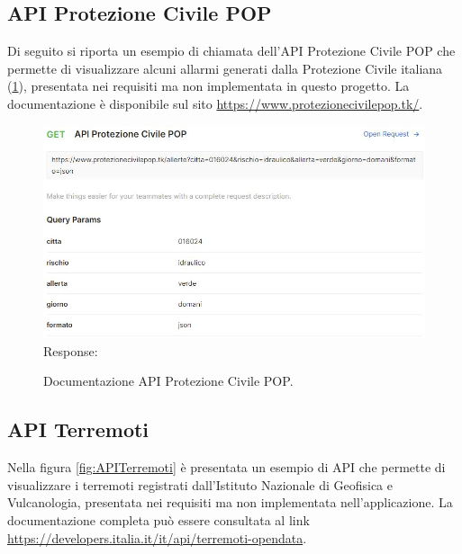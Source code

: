 \clearpage

\subsection{API Protezione Civile POP}
Di seguito si riporta un esempio di chiamata dell'API Protezione Civile POP che permette di visualizzare alcuni allarmi generati dalla Protezione Civile italiana (\Fig\ref{fig:APIPOP}), presentata nei requisiti ma non implementata in questo progetto. La documentazione è disponibile sul sito \url{https://www.protezionecivilepop.tk/}.

\begin{figure}[h!]
	\centering
	\includegraphics[width=0.95\linewidth]{./Conclusione/ImageFiles/APIProtezioneCivilePOPRequest}
	Response:
	
	\caption{Documentazione API Protezione Civile POP.}
	\label{fig:APIPOP}
\end{figure}

\clearpage

\subsection{API Terremoti}
Nella figura \ref{fig:APITerremoti} è presentata un esempio di API che permette di visualizzare i terremoti registrati dall'Istituto Nazionale di Geofisica e Vulcanologia, presentata nei requisiti ma non implementata nell'applicazione. La documentazione completa può essere consultata al link \url{https://developers.italia.it/it/api/terremoti-opendata}.


